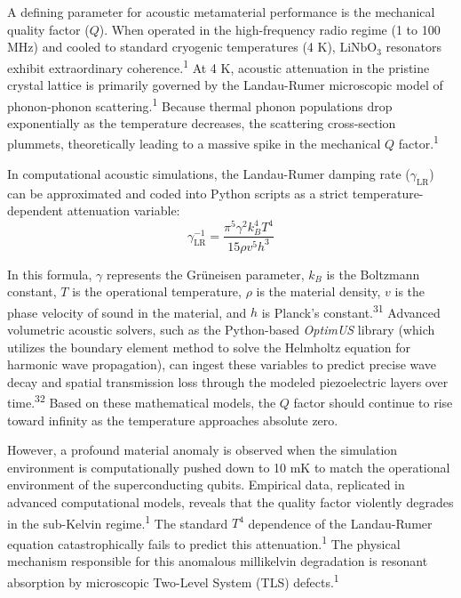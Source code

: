 \documentclass[11pt, a4paper]{article}
\begin{document}
A defining parameter for acoustic metamaterial performance is the mechanical quality factor ($Q$). When operated in the high-frequency radio regime (1 to 100 MHz) and cooled to standard cryogenic temperatures (4 K), $\text{LiNbO}_3$ resonators exhibit extraordinary coherence.\textsuperscript{1} At 4 K, acoustic attenuation in the pristine crystal lattice is primarily governed by the Landau-Rumer microscopic model of phonon-phonon scattering.\textsuperscript{1} Because thermal phonon populations drop exponentially as the temperature decreases, the scattering cross-section plummets, theoretically leading to a massive spike in the mechanical $Q$ factor.\textsuperscript{1}

In computational acoustic simulations, the Landau-Rumer damping rate ($\gamma_{\text{LR}}$) can be approximated and coded into Python scripts as a strict temperature-dependent attenuation variable:
\begin{equation}
\gamma_{\text{LR}}^{-1} = \frac{\pi^5 \gamma^2 k_B^4 T^4}{15\rho v^5 h^3}
\end{equation}

In this formula, $\gamma$ represents the Gr\"uneisen parameter, $k_B$ is the Boltzmann constant, $T$ is the operational temperature, $\rho$ is the material density, $v$ is the phase velocity of sound in the material, and $h$ is Planck's constant.\textsuperscript{31} Advanced volumetric acoustic solvers, such as the Python-based \textit{OptimUS} library (which utilizes the boundary element method to solve the Helmholtz equation for harmonic wave propagation), can ingest these variables to predict precise wave decay and spatial transmission loss through the modeled piezoelectric layers over time.\textsuperscript{32} Based on these mathematical models, the $Q$ factor should continue to rise toward infinity as the temperature approaches absolute zero.

However, a profound material anomaly is observed when the simulation environment is computationally pushed down to 10 mK to match the operational environment of the superconducting qubits. Empirical data, replicated in advanced computational models, reveals that the quality factor violently degrades in the sub-Kelvin regime.\textsuperscript{1} The standard $T^4$ dependence of the Landau-Rumer equation catastrophically fails to predict this attenuation.\textsuperscript{1} The physical mechanism responsible for this anomalous millikelvin degradation is resonant absorption by microscopic Two-Level System (TLS) defects.\textsuperscript{1}
\end{document}
